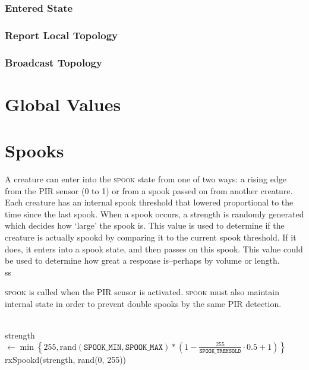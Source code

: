 \documentclass{article}
\newcommand{\code}{\texttt}
\newcommand{\rand}{\text{rand}}
\begin{document}
\subsubsection{Entered State}
\subsubsection{Report Local Topology}
\subsubsection{Broadcast Topology}

\clearpage
\section{Global Values}

\clearpage
\section{Spooks}
A creature can enter into the \textsc{spook} state from one of two ways: a rising edge from the PIR sensor (0 to 1) or from a spook passed on from another creature. 
Each creature has an internal spook threshold that lowered proportional to the time since the last spook.
When a spook occurs, a strength is randomly generated which decides how `large' the spook is.
This value is used to determine if the creature is actually spookd by comparing it to the current spook threshold. If it does, it enters into a spook state, and then passes on this spook.
This value could be used to determine how great a response is--perhaps by volume or length.\\ss

\textsc{spook} is called when the PIR sensor is activated. \textsc{spook} must also maintain internal state in order to prevent double spooks by the same PIR detection.
\begin{algorithm}
    \begin{algorithmic}[1]
        \\
            \qquad strength $\longleftarrow \min\left\{255, \rand(\code{SPOOK\_MIN},  \code{SPOOK\_MAX}) * \left(1 - \frac{255}{\code{SPOOK\_TREHSOLD}} \cdot 0.5 + 1\right)\right\}$\\
            \qquad rxSpookd(strength, rand(0, 255))
        \EndFunction
    \end{algorithmic}
\end{algorithm}
\end{document}
